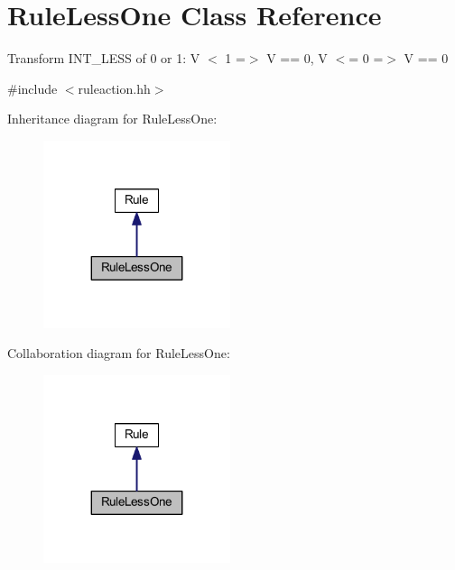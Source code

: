 \hypertarget{class_rule_less_one}{}\section{Rule\+Less\+One Class Reference}
\label{class_rule_less_one}


Transform I\+N\+T\+\_\+\+L\+E\+SS of 0 or 1\+: {\ttfamily V $<$ 1 =$>$ V == 0, V $<$= 0 =$>$ V == 0}  




{\ttfamily \#include $<$ruleaction.\+hh$>$}



Inheritance diagram for Rule\+Less\+One\+:
\nopagebreak
\begin{figure}[H]
\begin{center}
\leavevmode
\includegraphics[width=155pt]{class_rule_less_one__inherit__graph}
\end{center}
\end{figure}


Collaboration diagram for Rule\+Less\+One\+:
\nopagebreak
\begin{figure}[H]
\begin{center}
\leavevmode
\includegraphics[width=155pt]{class_rule_less_one__coll__graph}
\end{center}
\end{figure}
